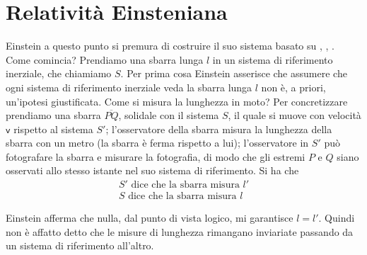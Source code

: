 \chapter{Relativit\`a Einsteniana}
\minitoc
Einstein a questo punto si premura di costruire il suo sistema basato
su , , . Come comincia? Prendiamo una
sbarra lunga $l$ in un sistema di riferimento inerziale, che chiamiamo
$S$. Per prima cosa Einstein asserisce che assumere che ogni sistema
di riferimento inerziale veda la sbarra lunga $l$ non \`e, a priori,
un'ipotesi giustificata. Come si misura la lunghezza in moto? Per
concretizzare prendiamo una sbarra $\overline{PQ}$, solidale con il
sistema $S$, il quale si muove con velocit\`a $\mathbf{\mathsf{v}}$
rispetto al sistema $S'$; l'osservatore della sbarra misura la
lunghezza della sbarra con un metro (la sbarra \`e ferma rispetto a
lui); l'osservatore in $S'$ pu\`o fotografare la sbarra e misurare la
fotografia, di modo che gli estremi $P$ e $Q$ siano osservati allo
stesso istante nel suo sistema di riferimento. Si ha che 
\begin{displaymath}
\begin{array}{l} S' \mbox{ dice che la sbarra misura } l'\\
  S \mbox{ dice che la sbarra misura } l \end{array}
\end{displaymath}

Einstein afferma che nulla, dal punto di vista logico, mi garantisce
$l=l'$. Quindi non \`e affatto detto che le misure di lunghezza
rimangano inviariate passando da un sistema di riferimento all'altro.
